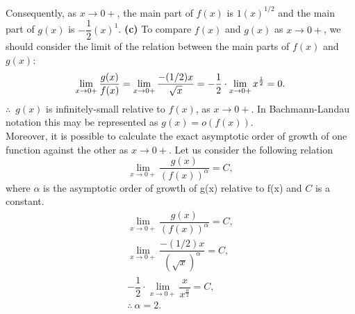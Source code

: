 Consequently, as $x\rightarrow0+$, the main part of $f(x)$ is $1(x)^{1/2}$ and the main part of $g(x)$ is $-\dfrac{1}{2}(x)^1$.
{\bf\flushleft (c)} To compare $f(x)$ and $g(x)$ as $x\rightarrow0+$, we should consider the limit of the relation between the main parts of $f(x)$ and $g(x)$:
$$
\lim\limits_{x\rightarrow0+}\dfrac{g(x)}{f(x)} = 
\lim\limits_{x\rightarrow0+}\dfrac{-(1/2)x}{\sqrt{x}} =
-\dfrac{1}{2}\cdot\lim\limits_{x\rightarrow0+}x^{\frac{1}{2}} = 0. \\
$$
$\therefore$\ $g(x)$ is infinitely-small relative to $f(x)$, as $x\rightarrow0+$. In Bachmann-Landau notation this may be represented as $g(x)=o(f(x))$.\\ [10pt]
Moreover, it is possible to calculate the exact asymptotic order of growth of one function against the other as $x\rightarrow0+$. Let us consider the following relation
$$
\lim\limits_{x\rightarrow0+}\dfrac{g(x)}{(f(x))^\alpha} = C,
$$
where $\alpha$ is the asymptotic order of growth of g(x) relative to f(x) and $C$ is a constant.
$$
\begin{array}{c}
\lim\limits_{x\rightarrow0+}\dfrac{g(x)}{(f(x))^\alpha} = C,\\ [14pt]
\lim\limits_{x\rightarrow0+}\dfrac{-(1/2)x}{(\sqrt{x})^\alpha} = C,\\ [12pt]
-\dfrac{1}{2}\cdot\lim\limits_{x\rightarrow0+}\dfrac{x}{x^{\frac{\alpha}{2}}} = C, \\ [10pt]
\therefore\ \alpha=2.
\end{array}
$$

\newpage
